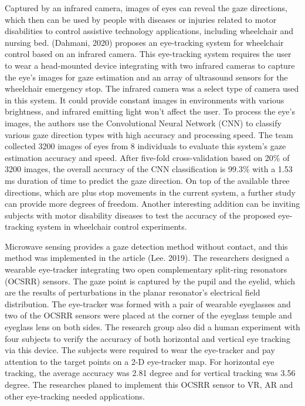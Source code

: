 Captured by an infrared camera, images of eyes can reveal the gaze directions, which then can be used by people with diseases or injuries related to motor disabilities to control assistive technology applications, including wheelchair and nursing bed. (Dahmani, 2020) proposes an eye-tracking system for wheelchair control based on an infrared camera. This eye-tracking system requires the user to wear a head-mounted device integrating with two infrared cameras to capture the eye's images for gaze estimation and an array of ultrasound sensors for the wheelchair emergency stop. The infrared camera was a select type of camera used in this system. It could provide constant images in environments with various brightness, and infrared emitting light won't affect the user. To process the eye's images, the authors use the Convolutional Neural Network (CNN) to classify various gaze direction types with high accuracy and processing speed. The team collected 3200 images of eyes from 8 individuals to evaluate this system's gaze estimation accuracy and speed. After five-fold cross-validation based on 20\% of 3200 images, the overall accuracy of the CNN classification is 99.3\%  with a 1.53 ms duration of time to predict the gaze direction. On top of the available three directions, which are plus stop movements in the current system, a further study can provide more degrees of freedom. Another interesting addition can be inviting subjects with motor disability diseases to test the accuracy of the proposed eye-tracking system in wheelchair control experiments. 

Microwave sensing provides a gaze detection method without contact, and this method was implemented in the article (Lee. 2019). The researchers designed a wearable eye-tracker integrating two open complementary split-ring resonators (OCSRR) sensors. The gaze point is captured by the pupil and the eyelid, which are the results of perturbations in the planar resonator's electrical field distribution. The eye-tracker was formed with a pair of wearable eyeglasses and two of the OCSRR sensors were placed at the corner of the eyeglass temple and eyeglass lens on both sides. The research group also did a human experiment with four subjects to verify the accuracy of both horizontal and vertical eye tracking via this device. The subjects were required to wear the eye-tracker and pay attention to the target points on a 2-D eye-tracker map. For horizontal eye tracking, the average accuracy was 2.81 degree and for vertical tracking was 3.56 degree. The researches planed to implement this OCSRR sensor to VR, AR and other eye-tracking needed applications.

